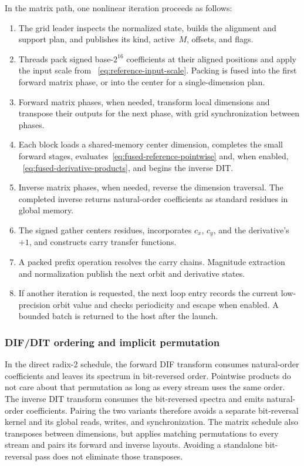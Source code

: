 In the matrix path, one nonlinear iteration proceeds as follows:

\begin{enumerate}
  \item The grid leader inspects the normalized state, builds the alignment and
        support plan, and publishes its kind, active~$M$, offsets, and flags.
  \item Threads pack signed base-$2^{16}$ coefficients at their aligned
        positions and apply the input scale from
        ~\eqref{eq:reference-input-scale}.  Packing is fused into the first
        forward matrix phase, or into the center for a single-dimension plan.
  \item Forward matrix phases, when needed, transform local dimensions and
        transpose their outputs for the next phase, with grid synchronization
        between phases.
  \item Each block loads a shared-memory center dimension, completes the small
        forward stages, evaluates~\eqref{eq:fused-reference-pointwise} and, when enabled,
        ~\eqref{eq:fused-derivative-products}, and begins the inverse DIT.
  \item Inverse matrix phases, when needed, reverse the dimension traversal.
        The completed inverse returns natural-order coefficients as standard
        residues in global memory.
  \item The signed gather centers residues, incorporates $c_x$, $c_y$, and the
        derivative's $+1$, and constructs carry transfer functions.
  \item A packed prefix operation resolves the carry chains.  Magnitude
        extraction and normalization publish the next orbit and derivative
        states.
  \item If another iteration is requested, the next loop entry records the
        current low-precision orbit value and checks periodicity and escape
        when enabled.  A bounded batch is returned to the host after the launch.
\end{enumerate}

\subsubsection{DIF/DIT ordering and implicit permutation}

In the direct radix-2 schedule, the forward DIF transform consumes natural-order
coefficients and leaves its spectrum in bit-reversed order.  Pointwise products do not care about that
permutation as long as every stream uses the same order.  The inverse DIT
transform consumes the bit-reversed spectra and emits natural-order
coefficients.  Pairing the two variants therefore avoids a separate bit-reversal
kernel and its global reads, writes, and synchronization.  The matrix schedule
also transposes between dimensions, but applies matching permutations to every
stream and pairs its forward and inverse layouts.  Avoiding a standalone
bit-reversal pass does not eliminate those transposes.

